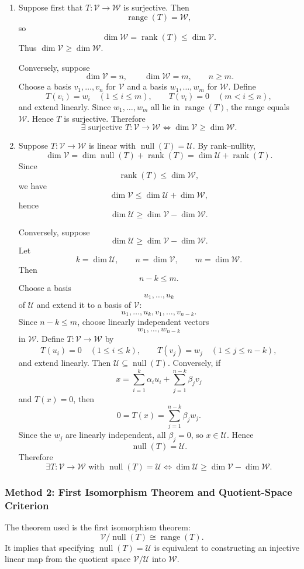 \documentclass[12pt]{article}
\newcommand{\V}{\mathcal{V}}
\newcommand{\W}{\mathcal{W}}
\newcommand{\U}{\mathcal{U}}
\newcommand{\Null}{\operatorname{null}}
\newcommand{\Range}{\operatorname{range}}
\newcommand{\rank}{\operatorname{rank}}
\begin{document}
\begin{enumerate}[label=(\alph*)]
  \item Suppose first that $T:\V\to\W$ is surjective. Then
  \[
  \Range(T)=\W,
  \]
  so
  \[
  \dim\W=\rank(T)\le\dim\V.
  \]
  Thus $\dim\V\ge\dim\W$.

  Conversely, suppose
  \[
  \dim\V=n,
  \qquad
  \dim\W=m,
  \qquad
  n\ge m.
  \]
  Choose a basis $v_1,\ldots,v_n$ for $\V$ and a basis $w_1,\ldots,w_m$ for $\W$. Define
  \[
  T(v_i)=w_i\quad(1\le i\le m),
  \qquad
  T(v_i)=0\quad(m<i\le n),
  \]
  and extend linearly. Since $w_1,\ldots,w_m$ all lie in $\Range(T)$, the range equals $\W$. Hence $T$ is surjective. Therefore
  \[
  \boxed{\exists\text{ surjective }T:\V\to\W\iff \dim\V\ge\dim\W.}
  \]

  \item Suppose $T:\V\to\W$ is linear with $\Null(T)=\U$. By rank--nullity,
  \[
  \dim\V=\dim\Null(T)+\rank(T)=\dim\U+\rank(T).
  \]
  Since
  \[
  \rank(T)\le\dim\W,
  \]
  we have
  \[
  \dim\V\le\dim\U+\dim\W,
  \]
  hence
  \[
  \dim\U\ge\dim\V-\dim\W.
  \]

  Conversely, suppose
  \[
  \dim\U\ge\dim\V-\dim\W.
  \]
  Let
  \[
  k=\dim\U,
  \qquad
  n=\dim\V,
  \qquad
  m=\dim\W.
  \]
  Then
  \[
  n-k\le m.
  \]
  Choose a basis
  \[
  u_1,\ldots,u_k
  \]
  of $\U$ and extend it to a basis of $\V$:
  \[
  u_1,\ldots,u_k,v_1,\ldots,v_{n-k}.
  \]
  Since $n-k\le m$, choose linearly independent vectors
  \[
  w_1,\ldots,w_{n-k}
  \]
  in $\W$. Define $T:\V\to\W$ by
  \[
  T(u_i)=0\quad(1\le i\le k),
  \qquad
  T(v_j)=w_j\quad(1\le j\le n-k),
  \]
  and extend linearly. Then $\U\subseteq\Null(T)$. Conversely, if
  \[
  x=\sum_{i=1}^{k}\alpha_i u_i+
  \sum_{j=1}^{n-k}\beta_jv_j
  \]
  and $T(x)=0$, then
  \[
  0=T(x)=\sum_{j=1}^{n-k}\beta_jw_j.
  \]
  Since the $w_j$ are linearly independent, all $\beta_j=0$, so $x\in\U$. Hence
  \[
  \Null(T)=\U.
  \]
  Therefore
  \[
  \boxed{\exists T:\V\to\W\text{ with }\Null(T)=\U
  \iff
  \dim\U\ge\dim\V-\dim\W.}
  \]
\end{enumerate}

\newpage
\subsubsection{Method 2: First Isomorphism Theorem and Quotient-Space Criterion}
The theorem used is the first isomorphism theorem:
\[
\V/\Null(T)\cong \Range(T).
\]
It implies that specifying $\Null(T)=\U$ is equivalent to constructing an injective linear map from the quotient space $\V/\U$ into $\W$.
\end{document}
